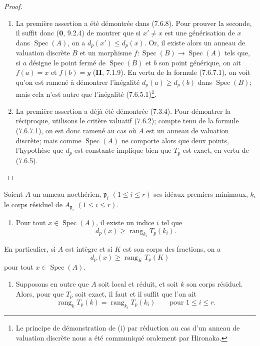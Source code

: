 \begin{proof}
\begin{enumerate}
  \item[(i)] La première assertion a été démontrée dans (7.6.8). Pour prouver
    la seconde, il suffit donc ($\mathbf{0}$, 9.2.4) de montrer que si $x'\ne x$ est une
    générisation de $x$ dans $\operatorname{Spec}(A)$, on a
    $d_p(x')\leq d_p(x)$. Or, il existe alors un anneau de valuation discrète
    $B$ et un morphisme
    $f:\operatorname{Spec}(B)\longrightarrow\operatorname{Spec}(A)$
    tels que, si $a$ désigne le point fermé de $\operatorname{Spec}(B)$ et $b$
    son point générique, on ait $f(a)=x$ et $f(b)=y$ (\textbf{II}, 7.1.9). En vertu de
    la formule (7.6.7.1), on voit qu'on est ramené à démontrer l'inégalité
    $d_p(a)\geq d_p(b)$ dans $\operatorname{Spec}(B)$; mais cela n'est autre que
    l'inégalité (7.6.5.1)\footnote{Le principe de démonstration de (i) par
    réduction au cas d'un anneau de valuation discrète nous a été communiqué
    oralement par Hironaka.}.
  \item[(ii)] La première assertion a déjà été démontrée (7.3.4). Pour démontrer
    la réciproque, utilisons le critère valuatif (7.6.2); compte tenu de la
    formule (7.6.7.1), on est donc ramené au cas où $A$ est un anneau de
    valuation discrète; mais comme $\operatorname{Spec}(A)$ ne comporte alors
    que deux points, l'hypothèse que $d_p$ est constante implique bien que $T_p$
    est exact, en vertu de (7.6.5).
\end{enumerate}
\end{proof}

\begin{corollary}[7.6.10]
Soient $A$ un anneau noethérien, $\mathfrak p_i$ $(1\leq i\leq r)$ ses idéaux
premiers minimaux, $k_i$ le corps résiduel de $A_{\mathfrak p_i}$
$(1\leq i\leq r)$.
\begin{enumerate}
  \item[\textup{(i)}] Pour tout $x\in\operatorname{Spec}(A)$, il existe un indice $i$
    tel que
    \[
      d_p(x)\geq\operatorname{rang}_{k_i}T_p(k_i).
      \tag{7.6.10.1}\label{III.7.6.10.1.fr}
    \]
\end{enumerate}

En particulier, si $A$ est intègre et si $K$ est son corps des fractions, on a
\[
  d_p(x)\geq\operatorname{rang}_K T_p(K)
  \tag{7.6.10.2}\label{III.7.6.10.2.fr}
\]
pour tout $x\in\operatorname{Spec}(A)$.
\begin{enumerate}
  \item[\textup{(ii)}] Supposons en outre que $A$ soit local et réduit, et soit $k$ son
    corps résiduel. Alors, pour que $T_p$ soit exact, il faut et il suffit que
    l'on ait
    \[
      \operatorname{rang}_k T_p(k)
      =
      \operatorname{rang}_{k_i}T_p(k_i)
      \qquad\text{pour }1\leq i\leq r.
      \tag{7.6.10.3}\label{III.7.6.10.3.fr}
    \]
\end{enumerate}
\end{corollary}

